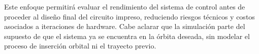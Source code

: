 Este enfoque permitirá evaluar el rendimiento del sistema de control antes de proceder al diseño final del circuito impreso, reduciendo riesgos técnicos y costos asociados a iteraciones de hardware. Cabe aclarar que la simulación parte del supuesto de que el sistema ya se encuentra en la órbita deseada, sin modelar el proceso de inserción orbital ni el trayecto previo.




